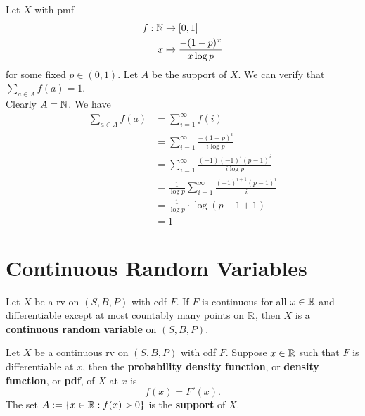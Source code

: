 \documentclass[11pt,fleqn]{book} %
\begin{document}
\begin{example} Let \(X\) with pmf
\[
\begin{aligned}
f: \mathbb{N} &\rightarrow [0, 1] \\
x &\mapsto \frac{-(1 - p)^x}{x \log p}
\end{aligned}
\]
for some fixed \(p \in (0, 1)\). Let \(A\) be the support of \(X\). We can verify that \(\sum_{a \in A} f(a) = 1\). \\
\indent Clearly \(A = \mathbb{N}\). We have
\[
\begin{aligned}
\sum_{a \in A} f(a) &= \sum_{i=1}^\infty f(i) \\
&= \sum_{i=1}^\infty \frac{-(1 - p)^i}{i \log p} \\
&= \sum_{i=1}^\infty \frac{(-1)(-1)^i(p-1)^i}{i \log p} \\
&= \frac{1}{\log p}\sum_{i=1}^\infty \frac{(-1)^{i+1}(p-1)^i}{i} \\
&= \frac{1}{\log p} \cdot \log(p - 1 + 1) \\
&= 1
\end{aligned}
\]
\end{example}


\section{Continuous Random Variables}

\begin{definition} 
Let \(X\) be a rv on \((S, B, P)\) with cdf \(F\). If \(F\) is continuous for all \(x \in \mathbb{R}\) and differentiable except at most countably many points on \(\mathbb{R}\), then \(X\) is a \textbf{continuous random variable} on \((S, B, P)\).
\end{definition}

\begin{definition} 
Let \(X\) be a continuous rv on \((S, B, P)\) with cdf \(F\). Suppose \(x \in \mathbb{R}\) such that \(F\) is differentiable at \(x\), then the \textbf{probability density function}, or \textbf{density function}, or \textbf{pdf}, of \(X\) at \(x\) is
\[
f(x) = F'(x).
\]
\indent The set \(A := \{x \in \mathbb{R}: f(x) > 0\}\) is the \textbf{support} of \(X\).
\end{definition}
\end{document}
